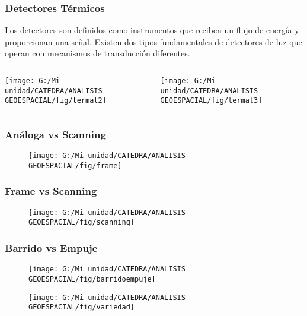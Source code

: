 \documentclass[14pt]{beamer}
\begin{document}
\begin{frame}
\frametitle{Detectores Térmicos}
\scriptsize{
Los detectores son definidos como instrumentos que reciben un flujo de energía y proporcionan una señal. Existen dos tipos fundamentales de detectores de luz que operan con mecanismos de transducción diferentes.
}
  \begin{columns}
		\begin{column}{.5\linewidth}
		 \texttt{[image: G:/Mi unidad/CATEDRA/ANALISIS GEOESPACIAL/fig/termal2]}
		\end{column}
		\begin{column}{.5\linewidth}
\texttt{[image: G:/Mi unidad/CATEDRA/ANALISIS GEOESPACIAL/fig/termal3]}
		\end{column}
	\end{columns}
\end{frame}
\begin{frame}
\frametitle{Análoga vs Scanning} 
 \begin{figure}
    \centering
    \texttt{[image: G:/Mi unidad/CATEDRA/ANALISIS GEOESPACIAL/fig/frame]}
  \end{figure}
\end{frame}
\begin{frame}
\frametitle{Frame vs Scanning} 
 \begin{figure}
    \centering
    \texttt{[image: G:/Mi unidad/CATEDRA/ANALISIS GEOESPACIAL/fig/scanning]}
  \end{figure}
\end{frame}
\begin{frame}
\frametitle{Barrido vs Empuje} 
 \begin{figure}
    \centering
    \texttt{[image: G:/Mi unidad/CATEDRA/ANALISIS GEOESPACIAL/fig/barridoempuje]}
  \end{figure}
\end{frame}
\begin{frame}
 \begin{figure}
    \centering
    \texttt{[image: G:/Mi unidad/CATEDRA/ANALISIS GEOESPACIAL/fig/variedad]}
  \end{figure}
\end{frame}
\end{document}
